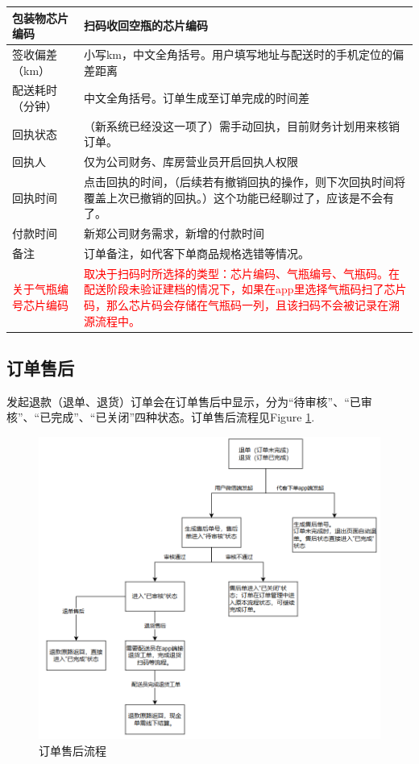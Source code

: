 \documentclass[UTF8]{ctexart}
\begin{document}
\begin{longtable}[h!]{ | m{3cm} | m{12cm} | }
		\hline
		包装物芯片编码& 扫码收回空瓶的芯片编码\\
		\hline
		签收偏差（km）& 小写km，中文全角括号。用户填写地址与配送时的手机定位的偏差距离\\
		\hline
		配送耗时（分钟）& 中文全角括号。订单生成至订单完成的时间差\\
		\hline
		回执状态& （新系统已经没这一项了）需手动回执，目前财务计划用来核销订单。\\
		\hline
		回执人	& 仅为公司财务、库房营业员开启回执人权限 \\
		\hline
		回执时间& 点击回执的时间，（后续若有撤销回执的操作，则下次回执时间将覆盖上次已撤销的回执。）这个功能已经聊过了，应该是不会有了。\\
		\hline
		付款时间& 新郑公司财务需求，新增的付款时间\\
		\hline
		备注& 订单备注，如代客下单商品规格选错等情况。\\
		\hline
		\textcolor{red}{关于气瓶编号芯片编码}& \textcolor{red}{取决于扫码时所选择的类型：芯片编码、气瓶编号、气瓶码。在配送阶段未验证建档的情况下，如果在app里选择气瓶码扫了芯片码，那么芯片码会存储在气瓶码一列，且该扫码不会被记录在溯源流程中。}\\
		\hline

\end{longtable}


\subsection{订单售后}

发起退款（退单、退货）订单会在订单售后中显示，分为“待审核”、“已审核”、“已完成”、“已关闭”四种状态。订单售后流程见Figure \ref{fig:chargeback}.

\begin{figure}[h]
	\centering
	\includegraphics[width=1\linewidth]{dlh_tutorial_figs/chargeback}
	\caption{订单售后流程}
	\label{fig:chargeback}
\end{figure}
\end{document}
